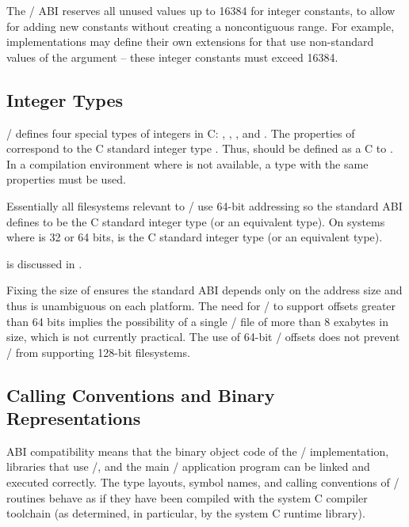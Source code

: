 The \MPI/ ABI reserves all unused values up to 16384 for integer constants,
to allow for adding new constants without creating a noncontiguous range.
For example, implementations may define their own extensions for
 that use non-standard values of the
 argument -- these integer constants must exceed 16384.

\subsection{Integer Types}

\MPI/ defines four special types of integers in C:
, , ,
and .
The properties of  correspond to the C standard integer type .
Thus,  should be defined as a C  to .
In a compilation environment where  is not available,
a type with the same properties must be used.

Essentially all filesystems relevant to \MPI/ use 64-bit addressing
so the standard ABI defines 
to be the C standard integer type  (or an equivalent type).
On systems where  is 32 or 64 bits,
 is the C standard integer type  (or an equivalent type).

 is discussed in .

\begin{rationale}
Fixing the size of  ensures the standard ABI
depends only on the address size and thus is unambiguous
on each platform.
The need for \MPI/ to support offsets greater than 64 bits
implies the possibility of a single \MPI/ file of more
than 8 exabytes in size, which is not currently practical. %
The use of 64-bit \MPI/ offsets does not prevent \MPI/
from supporting 128-bit filesystems.
\end{rationale}

\subsection{Calling Conventions and Binary Representations}

ABI compatibility 
means that the binary object code of the \MPI/ implementation, 
libraries that use \MPI/, and the main \MPI/ application 
program can be linked and executed correctly.
The type layouts, symbol names, and calling conventions of 
\MPI/ routines behave as if they have been compiled with the 
system C compiler toolchain 
(as determined, in particular, by the system C runtime library).

